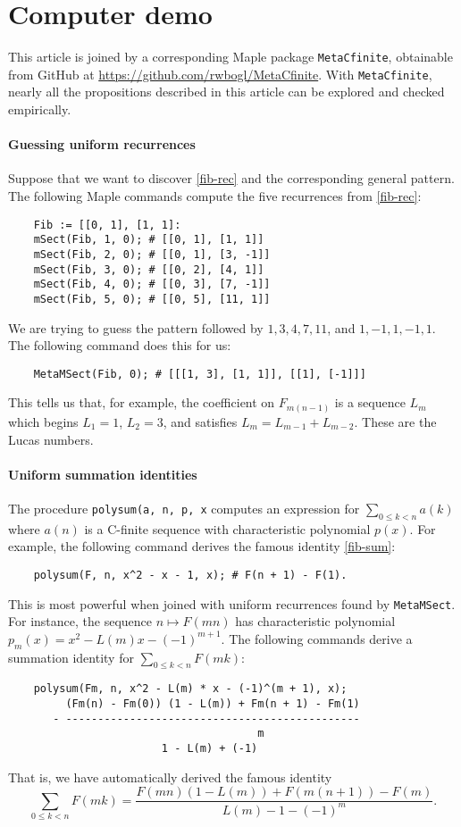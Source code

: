 \documentclass[12pt]{article}
\begin{document}
\section{Computer demo}

This article is joined by a corresponding Maple package \texttt{MetaCfinite}, obtainable from GitHub at \url{https://github.com/rwbogl/MetaCfinite}.
With \texttt{MetaCfinite}, nearly all the propositions described in this
article can be explored and checked empirically.

\paragraph{Guessing uniform recurrences} Suppose that we want to discover
\eqref{fib-rec} and the corresponding general pattern. The following Maple
commands compute the five recurrences from \eqref{fib-rec}:
\begin{verbatim}
    Fib := [[0, 1], [1, 1]:
    mSect(Fib, 1, 0); # [[0, 1], [1, 1]]
    mSect(Fib, 2, 0); # [[0, 1], [3, -1]]
    mSect(Fib, 3, 0); # [[0, 2], [4, 1]]
    mSect(Fib, 4, 0); # [[0, 3], [7, -1]]
    mSect(Fib, 5, 0); # [[0, 5], [11, 1]]
\end{verbatim}
We are trying to guess the pattern followed by $1, 3, 4, 7, 11$, and $1, -1, 1,
-1, 1$. The following command does this for us:
\begin{verbatim}
    MetaMSect(Fib, 0); # [[[1, 3], [1, 1]], [[1], [-1]]]
\end{verbatim}
This tells us that, for example, the coefficient on $F_{m(n - 1)}$ is a
sequence $L_m$ which begins $L_1 = 1$, $L_2 = 3$, and satisfies $L_m = L_{m -
1} + L_{m - 2}$. These are the Lucas numbers.

\paragraph{Uniform summation identities} The procedure \texttt{polysum(a, n, p,
x} computes an expression for $\sum_{0 \leq k < n} a(k)$ where $a(n)$ is a
C-finite sequence with characteristic polynomial $p(x)$. For example, the
following command derives the famous identity \eqref{fib-sum}:
\begin{verbatim}
    polysum(F, n, x^2 - x - 1, x); # F(n + 1) - F(1).
\end{verbatim}
This is most powerful when joined with uniform recurrences found by
\texttt{MetaMSect}. For instance, the sequence $n \mapsto F(mn)$ has
characteristic polynomial $p_m(x) = x^2 - L(m) x - (-1)^{m + 1}$. The following
commands derive a summation identity for $\sum_{0 \leq k < n} F(mk)$:
\begin{verbatim}
    polysum(Fm, n, x^2 - L(m) * x - (-1)^(m + 1), x);
         (Fm(n) - Fm(0)) (1 - L(m)) + Fm(n + 1) - Fm(1)
       - ----------------------------------------------
                                       m
                        1 - L(m) + (-1)
\end{verbatim}
That is, we have automatically derived the famous identity
\begin{equation*}
    \sum_{0 \leq k < n} F(mk) = \frac{F(mn) (1 - L(m)) + F(m(n + 1)) - F(m)}{L(m) - 1 - (-1)^m}.
\end{equation*}
\end{document}
